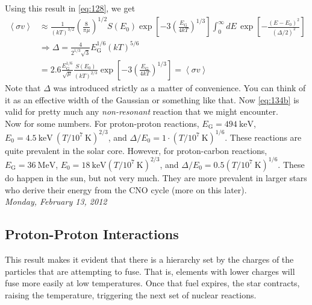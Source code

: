 \documentclass[10pt]{article}
\numberwithin{equation}{section}
\newcommand{\n}{\noindent}
\newcommand{\avg}[1]{\left\langle#1\right\rangle}
\begin{document}
  Using this result in \eqref{eq:128}, we get
  \begin{align}
    \label{eq:134}
    \avg{\sigma v} & \approx
    \frac{1}{(kT)^{3/2}}\left(\frac{8}{\pi\mu}\right)^{1/2}S(E_0)\exp\left
[-3\left(\frac{E_{\mathrm{G}}}{4kT}\right)^{1/3}\right]\int_0^\infty dE\,
    \exp\left[-\frac{(E-E_0)^2}{(\Delta/2)^2}\right]\\
    \label{eq:134a}
    & \Rightarrow \boxed{\Delta =
      \frac{4}{2^{1/3}\sqrt{3}}E_{\mathrm{G}}^{1/6}(kT)^{5/6}}\\
    \label{eq:134b}
    &=
    \boxed{2.6\frac{E_{\mathrm{G}}^{1/6}}{\sqrt{\mu}}\frac{S(E_0)}{(kT)^
{2/3}}\exp\left[-3\left(\frac{E_{\mathrm{G}}}{4kT}\right)^{1/3}\right]=\avg
{\sigma v}}
  \end{align}
  Note that $\Delta$ was introduced strictly as a matter of
  convenience. You can think of it as an effective width of the
  Gaussian or something like that. Now \eqref{eq:134b} is valid for
  pretty much any \emph{non-resonant} reaction that we might
  encounter.\\

  \n Now for some numbers. For proton-proton reactions,
  $E_{\mathrm{G}}=494\ \mathrm{keV}$, $E_0=4.5\ \mathrm{keV}\
  \left(T/10^7\ \mathrm{K}\right)^{2/3}$, and $\Delta/E_0=1\cdot
  (T/10^7\ \mathrm{K})^{1/6}$. These reactions are quite prevalent in
  the solar core. However, for proton-carbon reactions,
  $E_\mathrm{G}=36\ \mathrm{MeV}$, $E_0=18\ \mathrm{keV}(T/10^7\
  \mathrm{K})^{2/3}$, and $\Delta/E_0=0.5(T/10^7\
  \mathrm{K})^{1/6}$. These do happen in the sun, but not very
  much. They are more prevalent in larger stars who derive their
  energy from the CNO cycle (more on this later).\\
  
  \n \textit{Monday, February 13, 2012}\\

  \subsection{Proton-Proton Interactions}
  \label{sec:prot-prot-inter}

  \n This result makes it evident that there is a hierarchy set by the
  charges of the particles that are attempting to fuse. That is,
  elements with lower charges will fuse more easily at low
  temperatures. Once that fuel expires, the star contracts, raising
  the temperature, triggering the next set of nuclear reactions.\\
\end{document}
